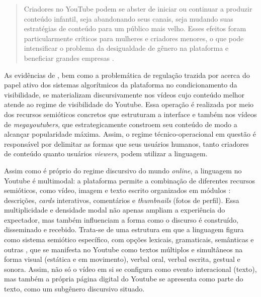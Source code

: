 \documentclass[portuguese]{textolivre}
\begin{document}
\begin{quote}
    Criadores no YouTube podem se abster de iniciar ou continuar a produzir conteúdo infantil, seja abandonando seus canais, seja mudando suas estratégias de conteúdo para um público mais velho. Esses efeitos foram particularmente críticos para mulheres e criadores menores, o que pode intensificar o problema da desigualdade de gênero na plataforma e beneficiar grandes empresas \cite[p. 117]{Barbosa2020CreatorsOperators}.
\end{quote}

As evidências de \textcite{Adami2009VideoInteraction,YuEtAl2024YouTubeRecommendations}, bem como a problemática de regulação trazida por \textcite{Barbosa2020CreatorsOperators} acerca do papel ativo dos sistemas algorítmicos da plataforma no condicionamento da visibilidade, se materializam discursivamente nos vídeos cujo conteúdo melhor atende ao regime de visibilidade do Youtube. Essa operação é realizada por meio dos recursos semióticos concretos que estruturam a interface e também nos vídeos de \textit{megayoutubers}, que estrategicamente constroem seu conteúdo de modo a alcançar popularidade máxima. Assim, o regime técnico-operacional em questão é responsável por delimitar as formas que seus usuários humanos, tanto criadores de conteúdo quanto usuários \textit{viewers}, podem utilizar a linguagem.

Assim como é próprio do regime discursivo do mundo \textit{online}, a linguagem no Youtube é multimodal: a plataforma permite a combinação de diferentes recursos semióticos, como vídeo, imagem e texto escrito organizados em módulos \cite{Benson2016DiscourseYouTube}: descrições, \textit{cards} interativos, comentários e \textit{thumbnails} (fotos de perfil). Essa multiplicidade e densidade modal \cite{Norris2009ModalDensity} não apenas ampliam a experiência do expectador, mas também influenciam a forma como o discurso é construído, disseminado e recebido. Trata-se de uma estrutura em que a linguagem figura como sistema semiótico específico, com opções lexicais, gramaticais, semânticas e outras \cite[p. 14]{VieiraResende2016AnaliseDiscursoCritica}, que se manifesta no Youtube como textos múltiplos e simultâneos na forma visual (estática e em movimento), verbal oral, verbal escrita, gestual e sonora. Assim, não só o vídeo em si se configura como evento interacional (texto), mas também a própria página digital do Youtube se apresenta como parte do texto, como um subgênero discursivo situado.
\end{document}
